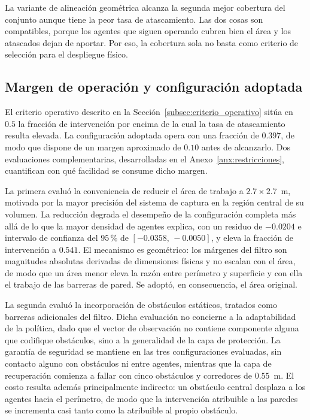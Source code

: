 La variante de alineación geométrica alcanza la segunda mejor cobertura del conjunto aunque tiene la peor tasa de atascamiento. Las dos cosas son compatibles, porque los agentes que siguen operando cubren bien el área y los atascados dejan de aportar. Por eso, la cobertura sola no basta como criterio de selección para el despliegue físico.

\subsection*{Margen de operación y configuración adoptada}

El criterio operativo descrito en la
Sección~\ref{subsec:criterio_operativo} sitúa en $0{.}5$ la fracción de
intervención por encima de la cual la tasa de atascamiento resulta elevada. La
configuración adoptada opera con una fracción de $0{.}397$, de modo que dispone
de un margen aproximado de $0{.}10$ antes de alcanzarlo. Dos evaluaciones
complementarias, desarrolladas en el Anexo~\ref{anx:restricciones},
cuantifican con qué facilidad se consume dicho margen.

La primera evaluó la conveniencia de reducir el área de trabajo a
$2{.}7 \times 2{.}7$~m, motivada por la mayor precisión del sistema de captura
en la región central de su volumen. La reducción degrada el desempeño de la
configuración completa más allá de lo que la mayor densidad de agentes
explica, con un residuo de $-0{.}0204$ e intervalo de confianza del $95$\,\% de
$[-0{.}0358,\, -0{.}0050]$, y eleva la fracción de intervención a $0{.}541$. El
mecanismo es geométrico: los márgenes del filtro son magnitudes absolutas
derivadas de dimensiones físicas y no escalan con el área, de modo que un área
menor eleva la razón entre perímetro y superficie y con ella el trabajo de las
barreras de pared. Se adoptó, en consecuencia, el área original.

La segunda evaluó la incorporación de obstáculos estáticos, tratados como
barreras adicionales del filtro. Dicha evaluación no
concierne a la adaptabilidad de la política, dado que el vector de observación
no contiene componente alguna que codifique obstáculos, sino a la generalidad
de la capa de protección. La garantía de seguridad se mantiene en las tres
configuraciones evaluadas, sin contacto alguno con obstáculos ni entre agentes,
mientras que la capa de recuperación comienza a fallar con cinco obstáculos y
corredores de $0{.}55$~m. El costo resulta además principalmente indirecto: un
obstáculo central desplaza a los agentes hacia el perímetro, de modo que la
intervención atribuible a las paredes se incrementa casi tanto como la
atribuible al propio obstáculo.

